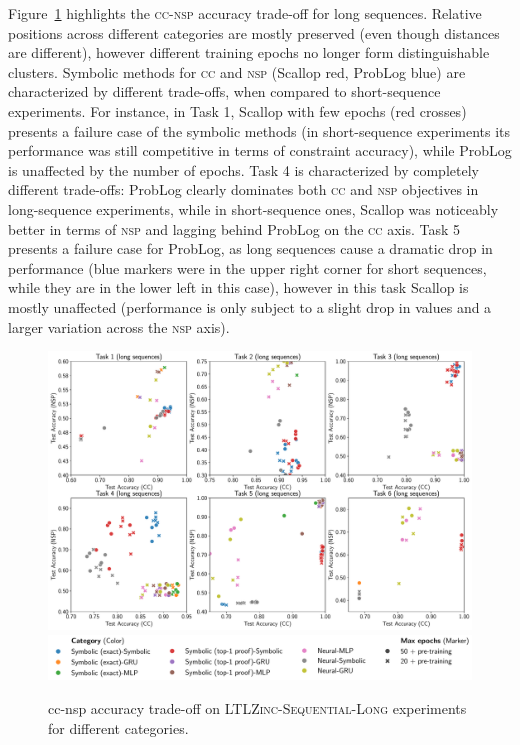 %
Figure~\ref{ltlzinc:fig:sequential-tradeoff-long} highlights the \textsc{cc}-\textsc{nsp} accuracy trade-off for long sequences. Relative positions across different categories are mostly preserved (even though distances are different), however different training epochs no longer form distinguishable clusters. Symbolic methods for \textsc{cc} and \textsc{nsp} (Scallop red, ProbLog blue) are characterized by different trade-offs, when compared to short-sequence experiments.
For instance, in Task 1, Scallop with few epochs (red crosses) presents a failure case of the symbolic methods (in short-sequence experiments its performance was still competitive in terms of constraint accuracy), while ProbLog is unaffected by the number of epochs. Task 4 is characterized by completely different trade-offs: ProbLog clearly dominates both \textsc{cc} and \textsc{nsp} objectives in long-sequence experiments, while in short-sequence ones, Scallop was noticeably better in terms of \textsc{nsp} and lagging behind ProbLog on the \textsc{cc} axis.
Task 5 presents a failure case for ProbLog, as long sequences cause a dramatic drop in performance (blue markers were in the upper right corner for short sequences, while they are in the lower left in this case), however in this task Scallop is mostly unaffected (performance is only subject to a slight drop in values and a larger variation across the \textsc{nsp} axis).
\begin{figure}
\centering
\includegraphics[width=1.0\textwidth]{imgs/ltlzinc/const-vs-succ-long.pdf}
\includegraphics[width=1.0\textwidth]{imgs/ltlzinc/const-vs-succ_legend.pdf}
\caption[\textsc{cc}--\textsc{nsp} accuracy-trade-off on \textsc{LTLZinc-Sequential-Long}]{{\sc cc}-{\sc nsp} accuracy trade-off on \textsc{LTLZinc-Sequential-Long} experiments for different categories.} %
\label{ltlzinc:fig:sequential-tradeoff-long}
\end{figure}



